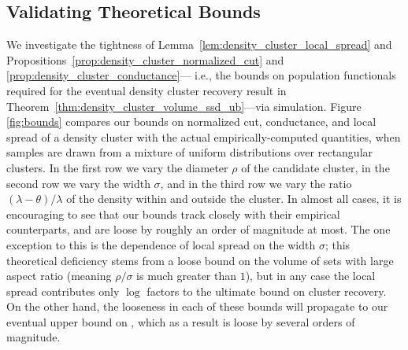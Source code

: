 \documentclass[twoside,11pt]{article}
\newcommand{\1}{\mathbf{1}}
\newcommand{\mc}[1]{\mathcal{#1}}
\newcommand{\wh}[1]{\widehat{#1}}
\newcommand{\vol}{\mathrm{vol}}
\begin{document}
\subsection{Validating Theoretical Bounds}
We investigate the tightness of Lemma~\ref{lem:density_cluster_local_spread} and Propositions~\ref{prop:density_cluster_normalized_cut} and \ref{prop:density_cluster_conductance}--- i.e., the bounds on population functionals required for the eventual density cluster recovery result in Theorem~\ref{thm:density_cluster_volume_ssd_ub}---via simulation. Figure \ref{fig:bounds} compares our bounds on normalized cut, conductance, and local spread of a density cluster with the actual empirically-computed quantities, when samples are drawn from a mixture of uniform distributions over rectangular clusters. In the first row we vary the diameter $\rho$ of the candidate cluster, in the second row we vary the width $\sigma$, and in the third row we vary the ratio $(\lambda - \theta)/\lambda$ of the density within and outside the cluster. In almost all cases, it is encouraging to see that our bounds track closely with their empirical counterparts, and are loose by roughly an order of magnitude at most. The one exception to this is the dependence of local spread on the width $\sigma$; this theoretical deficiency stems from a loose bound on the volume of sets with large aspect ratio (meaning $\rho/\sigma$ is much greater than $1$), but in any case the local spread contributes only $\log$ factors to the ultimate bound on cluster recovery. On the other hand, the looseness in each of these bounds will propagate to our eventual upper bound on \smash{$\Delta(\wh{C},\mc{C}_{\lambda,\sigma}[X])/\vol_{n,r}(\mc{C}_{\lambda,\sigma}[X])$}, which as a result is loose by several orders of magnitude. 
\end{document}
